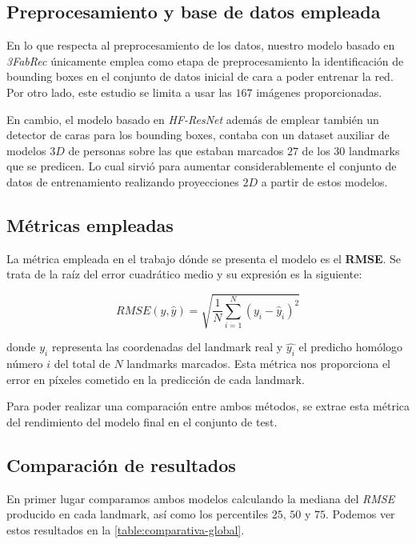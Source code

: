         \subsection{Preprocesamiento y base de datos empleada}
            \noindent En lo que respecta al preprocesamiento de los datos, nuestro modelo basado en \textit{3FabRec} únicamente emplea como etapa de preprocesamiento la identificación de bounding boxes en el conjunto de datos inicial de cara a poder entrenar la red. Por otro lado, este estudio se limita a usar las $167$ imágenes proporcionadas.

            \medskip

            \noindent En cambio, el modelo basado en \textit{HF-ResNet} además de emplear también un detector de caras para los bounding boxes, contaba con un dataset auxiliar de modelos $3D$ de personas sobre las que estaban marcados $27$ de los $30$ landmarks que se predicen. Lo cual sirvió para aumentar considerablemente el conjunto de datos de entrenamiento realizando proyecciones $2D$ a partir de estos modelos.

        \subsection{Métricas empleadas}
            \noindent La métrica empleada en el trabajo dónde se presenta el modelo es el \textbf{RMSE}. Se trata de la raíz del error cuadrático medio y su expresión es la siguiente: 

            \begin{equation}
                RMSE(y,\widehat{y})= \sqrt{\frac{1}{N} \sum_{i=1}^{N} (y_i-\widehat{y}_i)^2}
            \end{equation}

            \noindent donde $y_i$ representa las coordenadas del landmark real y $\widehat{y_i}$ el predicho homólogo número $i$ del total de $N$ landmarks marcados. Esta métrica nos proporciona el error en píxeles cometido en la predicción de cada landmark.

            \medskip

            \noindent Para poder realizar una comparación entre ambos métodos, se extrae esta métrica del rendimiento del modelo final en el conjunto de test. 

        \subsection{Comparación de resultados}
            \noindent En primer lugar comparamos ambos modelos calculando la mediana del \textit{RMSE} producido en cada landmark, así como los percentiles $25$, $50$ y $75$. Podemos ver estos resultados en la \autoref{table:comparativa-global}.

